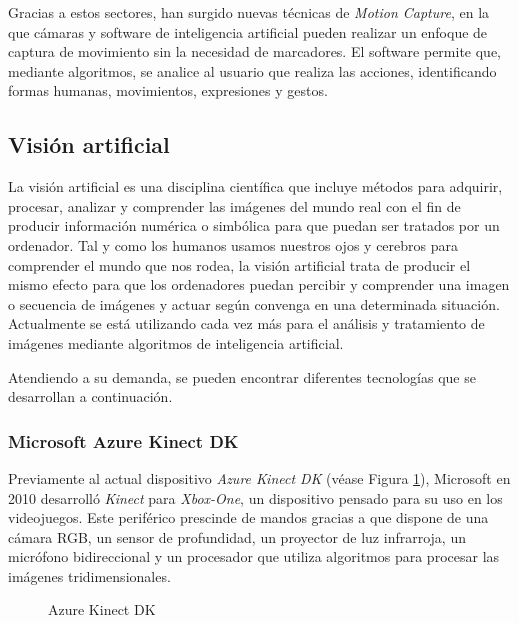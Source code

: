 Gracias a estos sectores, han surgido nuevas técnicas de \textit{Motion Capture}, en la que cámaras y software de inteligencia artificial pueden realizar un enfoque de captura de movimiento sin la necesidad de marcadores. El software permite que, mediante algoritmos, se analice al usuario que realiza las acciones, identificando formas humanas, movimientos, expresiones y gestos.


\subsection{Visión artificial}

La visión artificial\cite{Visionartificial} es una disciplina científica que incluye métodos para adquirir, procesar, analizar y comprender las imágenes del mundo real con el fin de producir información numérica o simbólica para que puedan ser tratados por un ordenador. Tal y como los humanos usamos nuestros ojos y cerebros para comprender el mundo que nos rodea, la visión artificial trata de producir el mismo efecto para que los ordenadores puedan percibir y comprender una imagen o secuencia de imágenes y actuar según convenga en una determinada situación. Actualmente se está utilizando cada vez más para el análisis y tratamiento de imágenes mediante algoritmos de inteligencia artificial. 

Atendiendo a su demanda, se pueden encontrar diferentes tecnologías que se desarrollan a continuación.

\subsubsection{Microsoft Azure Kinect DK}

Previamente al actual dispositivo \textit{Azure Kinect DK} (véase Figura \ref{fig:AzureKinectDK}), Microsoft en 2010 desarrolló \textit{Kinect} para \textit{Xbox-One}, un dispositivo pensado para su uso en los videojuegos. Este periférico prescinde de mandos gracias a que dispone de una cámara RGB, un sensor de profundidad, un proyector de luz infrarroja, un micrófono bidireccional y un procesador que utiliza algoritmos para procesar las imágenes tridimensionales.

\begin{figure}[h!]
    \centering
    \caption{Azure Kinect DK}
    \label{fig:AzureKinectDK}   
\end{figure}



